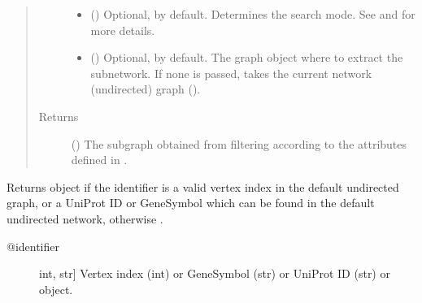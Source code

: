 \documentclass[letterpaper,10pt,english]{sphinxmanual}
\begin{document}
\begin{fulllineitems}
\begin{fulllineitems}
\begin{quote}
\begin{description}
\begin{itemize}
\item {} 
 () \textendash{} Optional,  by default. Determines the search mode.
See {\hyperref[\detokenize{reference:pypath.main.PyPath.search_attr_or}]{}} and
{\hyperref[\detokenize{reference:pypath.main.PyPath.search_attr_and}]{}} for more
details.

\item {} 
 () \textendash{} Optional,  by default. The graph object where to
extract the subnetwork. If none is passed, takes the current
network (undirected) graph
().

\end{itemize}

\item[{Returns}] \leavevmode
() \textendash{} The subgraph obtained from filtering
according to the attributes defined in .

\end{description}\end{quote}

\end{fulllineitems}


\begin{fulllineitems}
\label{\detokenize{reference:pypath.main.PyPath.get_node}}
Returns  object if the identifier
is a valid vertex index in the default undirected graph,
or a UniProt ID or GeneSymbol which can be found in the
default undirected network, otherwise .
\begin{description}
\item[{@identifier}] \leavevmode{[}int, str{]}
Vertex index (int) or GeneSymbol (str) or UniProt ID (str) or
 object.


\end{description}
\end{fulllineitems}
\end{fulllineitems}
\end{document}
